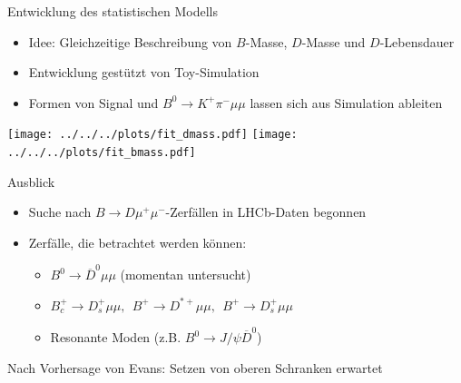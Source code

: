 \documentclass[compress,aspectratio=43]{beamer}
\begin{document}
\begin{frame}[shrink=10]{Entwicklung des statistischen Modells}
  \begin{itemize}
    \item Idee: Gleichzeitige Beschreibung von $B$-Masse, $D$-Masse und $D$-Lebensdauer
    \item Entwicklung gestützt von Toy-Simulation
    \item Formen von Signal und $B^0\to K^+\pi^-\mu\mu$ lassen sich aus Simulation ableiten
  \end{itemize}
  \centering
  \texttt{[image: ../../../plots/fit\_dmass.pdf]}
  \texttt{[image: ../../../plots/fit\_bmass.pdf]}
\end{frame}


\begin{frame}{Ausblick}
  \begin{itemize}
    \item Suche nach $B\!\to\! D \mu^+\mu^-$-Zerfällen in LHCb-Daten begonnen
    \item Zerfälle, die betrachtet werden können:
    \begin{itemize}
      \item $B^0\!\to\!\overline{D}^0\mu\mu$ (momentan untersucht)
      \item $B_c^+\!\to\! D_s^+\mu\mu,\ \  B^+\!\to\! D^{*+}\mu\mu,\ \ B^+\!\to\! D_s^{+}\mu\mu$
      \item Resonante Moden (z.B. $B^0\!\to\! J\!/\!\psi \overline{D}^0$)
    \end{itemize}
  \end{itemize}
  Nach Vorhersage von Evans: Setzen von oberen Schranken erwartet
\end{frame}
\end{document}
